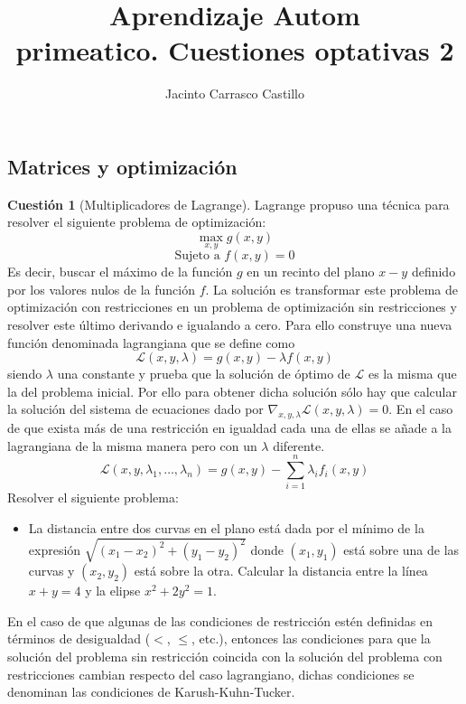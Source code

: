 \documentclass[11pt,leqno]{article}
\title{Aprendizaje Autom\\primeatico. Cuestiones optativas 2}
\author{Jacinto Carrasco Castillo}
\theoremstyle{definition}
\begin{document}
\maketitle

\newtheorem{cuestion}{Cuestión}
\newtheorem{solucion}{Solución}

\subsection{Matrices y optimización}
\begin{cuestion}[Multiplicadores de Lagrange]
Lagrange propuso una técnica para resolver el siguiente problema de optimización:
    \[ \max_{x,y} g(x,y) \]
    \[ \text{Sujeto a } f(x,y)=0 \]
    Es decir, buscar el máximo de la función $g$ en un recinto del plano $x-y$ definido por los valores nulos de la función $f$. La solución es transformar este problema de optimización con restricciones en un problema de optimización sin restricciones y resolver este último derivando e igualando a cero. Para ello construye una nueva función denominada lagrangiana que se define como
    \[
    \mathcal{L}(x,y,\lambda)=g(x,y)-\lambda f(x,y)
    \]
    siendo $\lambda$ una constante y prueba que la solución de óptimo de $\mathcal{L}$ es la misma que la del problema inicial. Por ello para obtener dicha solución sólo hay que calcular la solución del sistema de ecuaciones dado por $\nabla_{x,y,\lambda}\mathcal{L}(x,y,\lambda)=0$. En el caso de que exista más de una restricción en igualdad cada una de ellas se añade a la lagrangiana de la misma manera pero con un $\lambda$ diferente.
    \[ \mathcal{L}(x,y,\lambda_1,\dots,\lambda_n)=
    			g(x,y)-\sum_{i=1}^n \lambda_i f_i(x,y)
    \]
    Resolver el siguiente problema:
    \begin{itemize}
    \item La distancia entre dos curvas en el plano está dada por el mínimo de la expresión $\sqrt{(x_1-x_2)^2+(y_1-y_2)^2}$ donde $(x_1,y_1)$ está sobre una de las curvas y $(x_2,y_2)$ está sobre la otra. Calcular la distancia entre la línea $x+y=4$ y la elipse $x^2+2y^2=1$.
    \end{itemize}
    
    En el caso de que algunas de las condiciones de restricción estén definidas en términos de desigualdad ($<$, $\leq$, etc.), entonces las condiciones para que la solución del problema sin restricción coincida con la solución del problema con restricciones cambian respecto del caso lagrangiano, dichas condiciones se denominan las condiciones de \textrm{Karush-Kuhn-Tucker}.
\end{cuestion}
\end{document}
